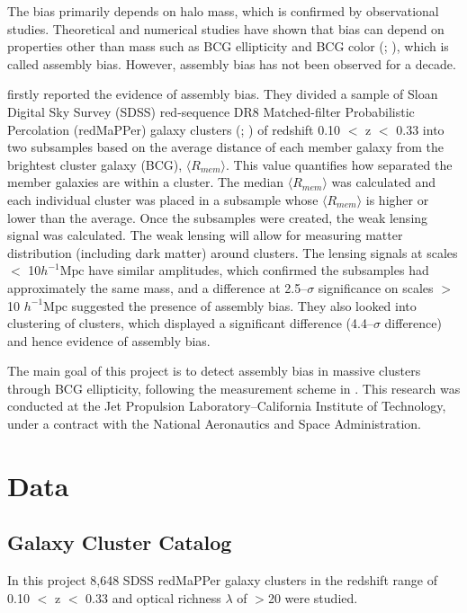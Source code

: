 \documentclass[iop]{emulateapj}
\begin{document}
The bias primarily depends on halo mass, which is confirmed by observational studies. Theoretical and numerical studies have shown that bias can depend on properties other than mass such as BCG ellipticity and BCG color (\cite{2008ApJ...687...12D}; \cite{2014ApJ...785..104R}), which is called assembly bias. However, assembly bias has not been observed for a decade.

\cite{2016PhRvL.116d1301M} firstly reported the evidence of assembly bias. They divided a sample of Sloan Digital Sky Survey (SDSS) red-sequence DR8 Matched-filter Probabilistic Percolation (redMaPPer) galaxy clusters (\cite{2011ApJS..193...29A}; \cite{2014ApJ...785..104R}) of redshift 0.10  $<$ z $<$ 0.33 into two subsamples based on the average distance of each member galaxy from the brightest cluster galaxy (BCG), $\langle R_{mem} \rangle$. This value quantifies how separated the member galaxies are within a cluster. The median $\langle R_{mem} \rangle$ was calculated and each individual cluster was placed in a subsample whose  $\langle R_{mem} \rangle$ is higher or lower than the average. Once the subsamples were created, the weak lensing signal was calculated. The weak lensing will allow for measuring matter distribution (including dark matter) around clusters. The lensing signals at scales $<$ 10$h^{-1} \mathrm{Mpc}$ have similar amplitudes, which confirmed the subsamples had approximately the same mass, and a difference at 2.5--$\sigma$ significance on scales $>$ 10 $h^{-1} \mathrm{Mpc}$ suggested the presence of assembly bias. They also looked into clustering of clusters, which displayed a significant difference (4.4--$\sigma$ difference) and hence evidence of assembly bias.

The main goal of this project is to detect assembly bias in massive clusters through BCG ellipticity, following the measurement scheme in \cite{2016PhRvL.116d1301M}. This research was conducted at the Jet Propulsion Laboratory--California Institute of Technology, under a contract with the National Aeronautics and Space Administration.

\section{Data}
\subsection{Galaxy Cluster Catalog}
In this project 8,648 SDSS redMaPPer galaxy clusters in the redshift range of 0.10 $<$ z $<$ 0.33 and optical richness $\lambda$ of $>$20 were studied.
\end{document}
